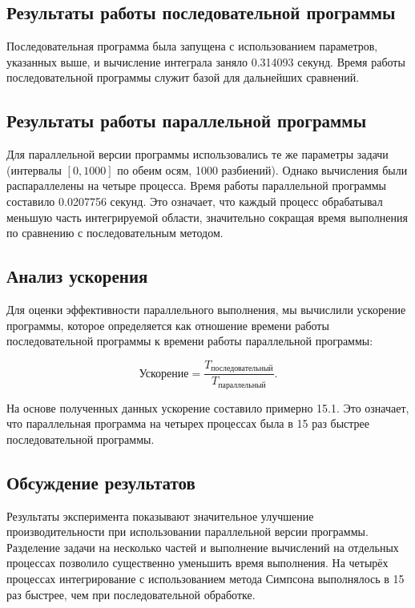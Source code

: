 \documentclass{report}
\begin{document}
\subsection*{Результаты работы последовательной программы}

Последовательная программа была запущена с использованием параметров, указанных выше, и вычисление интеграла заняло 0.314093 секунд. Время работы последовательной программы служит базой для дальнейших сравнений.

\subsection*{Результаты работы параллельной программы}

Для параллельной версии программы использовались те же параметры задачи (интервалы \([0, 1000]\) по обеим осям, 1000 разбиений). Однако вычисления были распараллелены на четыре процесса. Время работы параллельной программы составило 0.0207756 секунд. Это означает, что каждый процесс обрабатывал меньшую часть интегрируемой области, значительно сокращая время выполнения по сравнению с последовательным методом.

\subsection*{Анализ ускорения}

Для оценки эффективности параллельного выполнения, мы вычислили ускорение программы, которое определяется как отношение времени работы последовательной программы к времени работы параллельной программы:

\[
\text{Ускорение} = \frac{T_{\text{последовательный}}}{T_{\text{параллельный}}}.
\]

На основе полученных данных ускорение составило примерно 15.1. Это означает, что параллельная программа на четырех процессах была в 15 раз быстрее последовательной программы.

\subsection*{Обсуждение результатов}

Результаты эксперимента показывают значительное улучшение производительности при использовании параллельной версии программы. Разделение задачи на несколько частей и выполнение вычислений на отдельных процессах позволило существенно уменьшить время выполнения. На четырёх процессах интегрирование с использованием метода Симпсона выполнялось в 15 раз быстрее, чем при последовательной обработке.
\end{document}
